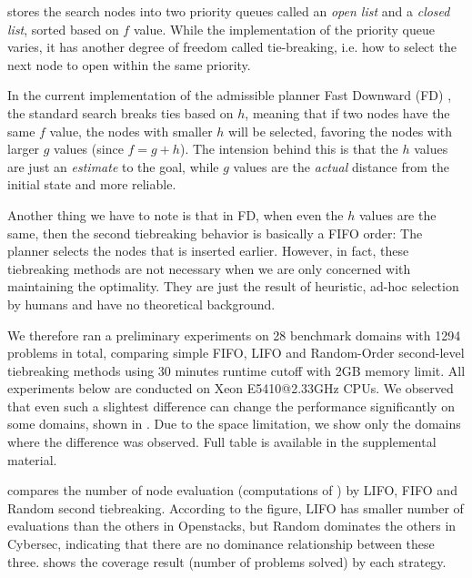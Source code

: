 
\astar stores the search nodes into two priority queues called an \emph{open list} and a \emph{closed list}, sorted based on $f$ value. While the implementation of the priority queue varies, it has another degree of freedom called tie-breaking, i.e. how to select the next node to open within the same priority.

In the current implementation of the \sota admissible planner Fast Downward (FD) \cite{Helmert2006}, the standard \astar search breaks ties based on $h$, meaning that if two nodes have the same $f$ value, the nodes with smaller $h$ will be selected, favoring the nodes with larger $g$ values (since $f=g+h$). The intension behind this is that the $h$ values are just an \emph{estimate} to the goal, while $g$ values are the \emph{actual} distance from the initial state and more reliable.

Another thing we have to note is that in FD, when even the $h$ values are the same, then the second tiebreaking behavior is basically a FIFO order: The planner selects the nodes that is inserted earlier. 
However, in fact, these tiebreaking methods are not necessary when we are only concerned with  maintaining the optimality. They are just the result of heuristic, ad-hoc selection by humans and have no theoretical background.

We therefore ran a preliminary experiments on 28 benchmark domains with
1294 problems in total, comparing simple FIFO, LIFO and Random-Order
second-level tiebreaking methods using 30 minutes runtime cutoff with
2GB memory limit.  All experiments below are conducted on Xeon
E5410@2.33GHz CPUs. We observed that even such a slightest difference
can change the performance significantly on some domains, shown in
. Due to the space limitation, we show only the
domains where the difference was observed. Full table is available in
the supplemental material.

 compares the number of
node evaluation (computations of \lmcut) by LIFO, FIFO and Random second
tiebreaking.  According to the figure, LIFO has smaller number of
evaluations than the others in Openstacks, but Random dominates the
others in Cybersec, indicating that there are no dominance relationship
between these three.   shows the coverage result
(number of problems solved) by each strategy.

